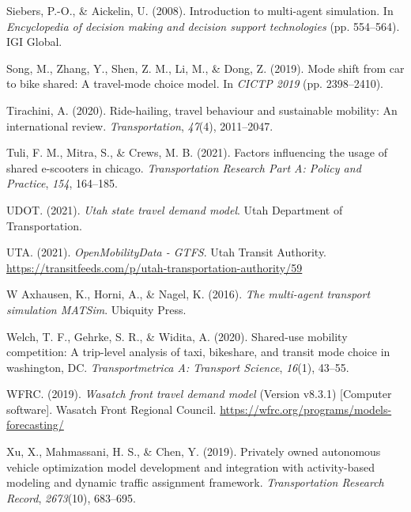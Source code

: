 \documentclass[fancy, masters]{byuthesis}
\newlength{\cslhangindent}
\newlength{\cslentryspacingunit} %
\newenvironment{CSLReferences}[2] %
 {%
  \setlength{\parindent}{0pt}
  \ifodd #1
  \let\oldpar\par
  \def\par{\hangindent=\cslhangindent\oldpar}
  \fi
  \setlength{\parskip}{#2\cslentryspacingunit}
 }%
 {}
\begin{document}
\begin{CSLReferences}{1}{0}
\leavevmode{}%
Siebers, P.-O., \& Aickelin, U. (2008). Introduction to multi-agent simulation. In \emph{Encyclopedia of decision making and decision support technologies} (pp. 554--564). IGI Global.

\leavevmode{}%
Song, M., Zhang, Y., Shen, Z. M., Li, M., \& Dong, Z. (2019). Mode shift from car to bike shared: A travel-mode choice model. In \emph{CICTP 2019} (pp. 2398--2410).

\leavevmode{}%
Tirachini, A. (2020). Ride-hailing, travel behaviour and sustainable mobility: An international review. \emph{Transportation}, \emph{47}(4), 2011--2047.

\leavevmode{}%
Tuli, F. M., Mitra, S., \& Crews, M. B. (2021). Factors influencing the usage of shared e-scooters in chicago. \emph{Transportation Research Part A: Policy and Practice}, \emph{154}, 164--185.

\leavevmode{}%
UDOT. (2021). \emph{Utah state travel demand model}. Utah Department of Transportation.

\leavevmode{}%
UTA. (2021). \emph{OpenMobilityData - GTFS}. Utah Transit Authority. \url{https://transitfeeds.com/p/utah-transportation-authority/59}

\leavevmode{}%
W Axhausen, K., Horni, A., \& Nagel, K. (2016). \emph{The multi-agent transport simulation MATSim}. Ubiquity Press.

\leavevmode{}%
Welch, T. F., Gehrke, S. R., \& Widita, A. (2020). Shared-use mobility competition: A trip-level analysis of taxi, bikeshare, and transit mode choice in washington, DC. \emph{Transportmetrica A: Transport Science}, \emph{16}(1), 43--55.

\leavevmode{}%
WFRC. (2019). \emph{Wasatch front travel demand model} (Version v8.3.1) {[}Computer software{]}. Wasatch Front Regional Council. \url{https://wfrc.org/programs/models-forecasting/}

\leavevmode{}%
Xu, X., Mahmassani, H. S., \& Chen, Y. (2019). Privately owned autonomous vehicle optimization model development and integration with activity-based modeling and dynamic traffic assignment framework. \emph{Transportation Research Record}, \emph{2673}(10), 683--695.


\end{CSLReferences}
\end{document}
